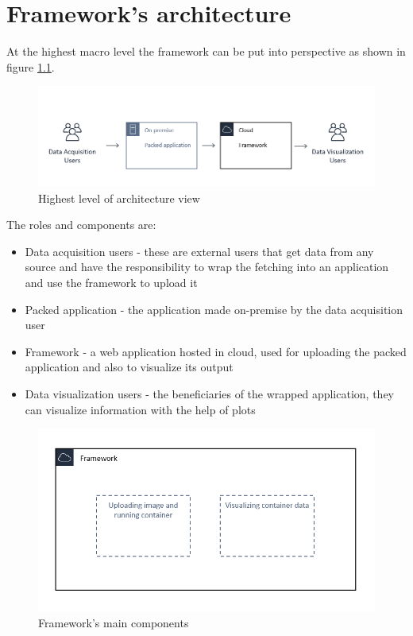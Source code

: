 \chapter{Framework's architecture}
\label{chap:03}

At the highest macro level the framework can be put into perspective as shown in figure \ref{fig:architecture1}. 


\begin{figure}[h]
	\centering
	\includegraphics[width=1\linewidth]{./images/architecture/highest_lvl.png}
	\caption{Highest level of architecture view}
	\label{fig:architecture1}
\end{figure}

The roles and components are:
\begin{itemize}
	\item Data acquisition users -  these are external users that get data from any source and have the responsibility to wrap the fetching into an application and use the framework to upload it
	\item Packed application - the application made on-premise by the data acquisition user
	\item Framework - a web application hosted in cloud, used for uploading the packed application and also to visualize its output
	\item Data visualization users - the beneficiaries of the wrapped application, they can visualize information with the help of plots
\end{itemize}

\begin{figure}[h]
	\centering
	\includegraphics[width=1\linewidth]{./images/architecture/framework.png}
	\caption{Framework's main components}
	\label{fig:architecture2}
\end{figure}

